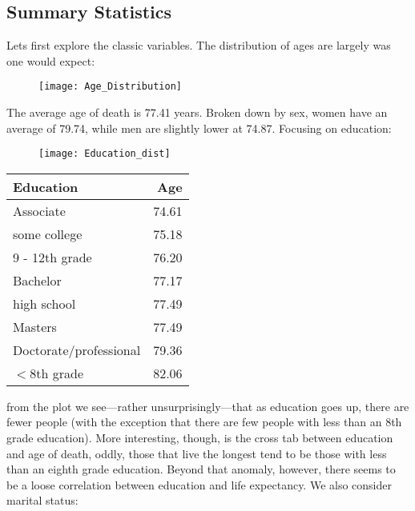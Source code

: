 \documentclass[letterpaper, 10 pt, conference]{ieeeconf}  %
\begin{document}
\subsection{Summary Statistics}
Lets first explore the classic variables. The distribution of ages are largely was one would expect:
\begin{figure}[ht]
\label{Age Distribution}
\begin{center}
\texttt{[image: Age\_Distribution]}
\end{center}
\end{figure}
The average age of death is 77.41 years. Broken down by sex, women have an average of 79.74, while men are slightly lower at 74.87. Focusing on education:
\begin{figure}[ht]
\label{Education Distribution}
\begin{center}
\texttt{[image: Education\_dist]}
\end{center}
\end{figure}
\begin{table}[ht]
\begin{center}

\begin{tabular}{lr}
\toprule
              Education &    Age \\
\midrule
              Associate &  74.61 \\
           some college &  75.18 \\
         9 - 12th grade &  76.20 \\
               Bachelor &  77.17 \\
            high school &  77.49 \\
                Masters &  77.49 \\
 Doctorate/professional &  79.36 \\
             $<$8th grade &  82.06 \\
\bottomrule
\end{tabular}
\end{center}
\end{table}
from the plot we see---rather unsurprisingly---that as education goes up, there are fewer people (with the exception that there are few people with less than an 8th grade education). More interesting, though, is the cross tab between education and age of death, oddly, those that live the longest tend to be those with less than an eighth grade education. Beyond that anomaly, however, there seems to be a loose correlation between education and life expectancy. We also consider marital status:
\end{document}
